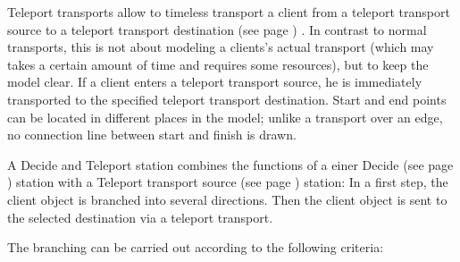 Teleport transports allow to timeless transport a client from a teleport transport source
to a teleport transport destination (see page \pageref{ref:ModelElementTeleportDestination}) .
In contrast to normal transports, this is not about modeling a clients's actual transport
(which may takes a certain amount of time and requires some resources), but to keep the model clear.
If a client enters a teleport transport source, he is immediately transported to the specified
teleport transport destination. Start and end points can be located in different places in the model;
unlike a transport over an edge, no connection line between start and finish is drawn.

A Decide and Teleport station combines the functions of a
einer Decide (see page \pageref{ref:ModelElementDecide}) station with a
Teleport transport source (see page \pageref{ref:ModelElementTeleportSource}) station:
In a first step, the client object is branched into several directions.
Then the client object is sent to the selected destination via a teleport transport.

The branching can be carried out according to the following criteria:

